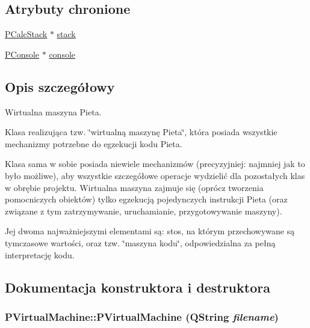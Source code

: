 \subsection*{Atrybuty chronione}
\begin{CompactItemize}
\item 
\hyperlink{classPCalcStack}{PCalcStack} $\ast$ \hyperlink{classPVirtualMachine_fe929445de96589087a96a8f1188fac0}{stack}
\item 
\hyperlink{classPConsole}{PConsole} $\ast$ \hyperlink{classPVirtualMachine_67feeb2d88b4c8b766d10d6f7d8eb65b}{console}
\end{CompactItemize}


\subsection{Opis szczegółowy}
Wirtualna maszyna Pieta. 

Klasa realizująca tzw. \char`\"{}wirtualną maszynę Pieta\char`\"{}, która posiada wszystkie mechanizmy potrzebne do egzekucji kodu Pieta.

Klasa sama w sobie posiada niewiele mechanizmów (precyzyjniej: najmniej jak to było możliwe), aby wszystkie szczegółowe operacje wydzielić dla pozostałych klas w obrębie projektu. Wirtualna maszyna zajmuje się (oprócz tworzenia pomocniczych obiektów) tylko egzekucją pojedynczych instrukcji Pieta (oraz związane z tym zatrzymywanie, uruchamianie, przygotowywanie maszyny).

Jej dwoma najważniejszymi elementami są: stos, na którym przechowywane są tymczasowe wartości, oraz tzw. \char`\"{}maszyna kodu\char`\"{}, odpowiedzialna za pełną interpretację kodu. 

\subsection{Dokumentacja konstruktora i destruktora}
\hypertarget{classPVirtualMachine_0af0326622a3f47b6c2020413cdd3e05}{
\subsubsection[{PVirtualMachine}]{\setlength{\rightskip}{0pt plus 5cm}PVirtualMachine::PVirtualMachine (QString {\em filename})}}
\label{classPVirtualMachine_0af0326622a3f47b6c2020413cdd3e05}


